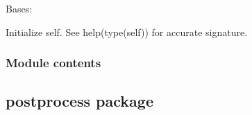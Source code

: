 \documentclass[letterpaper,10pt,english]{sphinxmanual}
\begin{document}
\begin{fulllineitems}
\label{\detokenize{optimization:optimization.optimizer.Optimizer}}
Bases: 

\begin{fulllineitems}
\label{\detokenize{optimization:optimization.optimizer.Optimizer.__init__}}
Initialize self.  See help(type(self)) for accurate signature.

\end{fulllineitems}


\begin{fulllineitems}
\label{\detokenize{optimization:optimization.optimizer.Optimizer.builder}}
\end{fulllineitems}


\begin{fulllineitems}
\label{\detokenize{optimization:optimization.optimizer.Optimizer.check}}
\end{fulllineitems}


\end{fulllineitems}



\subsubsection{Module contents}
\label{\detokenize{optimization:module-optimization}}\label{\detokenize{optimization:module-contents}}

\subsection{postprocess package}
\label{\detokenize{postprocess:postprocess-package}}\label{\detokenize{postprocess::doc}}
\end{document}
